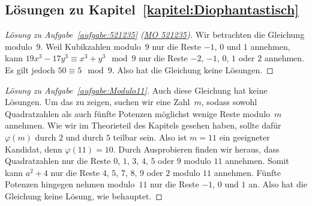 \subsection*{Lösungen zu Kapitel~\ref{kapitel:Diophantastisch}}


\begin{proof}[Lösung zu Aufgabe~\ref{aufgabe:521235} \textmd{(\href{https://www.mathematik-olympiaden.de/moev/index.php?option=com_download&thema=a&format=raw&datei=A52123b.pdf}{MO 521235})}]
	Wir betrachten die Gleichung modulo~$9$. Weil Kubikzahlen modulo~$9$ nur die Reste $-1$, $0$ und $1$ annehmen, kann $19x^3-17y^3\equiv x^3+y^3\mod 9$ nur die Reste $-2$, $-1$, $0$, $1$ oder $2$ annehmen. Es gilt jedoch $50\equiv 5\mod 9$. Also hat die Gleichung keine Lösungen.
\end{proof}

\begin{proof}[Lösung zu Aufgabe~\ref{aufgabe:Modulo11}]
	Auch diese Gleichung hat keine Lösungen. Um das zu zeigen, suchen wir eine Zahl~$m$, sodass sowohl Quadratzahlen als auch fünfte Potenzen möglichst wenige Reste modulo~$m$ annehmen. Wie wir im Theorieteil des Kapitels gesehen haben, sollte dafür $\varphi(m)$ durch $2$ und durch $5$ teilbar sein. Also ist $m=11$ ein geeigneter Kandidat, denn $\varphi(11)=10$. Durch Ausprobieren finden wir heraus, dass Quadratzahlen nur die Reste $0$, $1$, $3$, $4$, $5$ oder $9$ modulo $11$ annehmen. Somit kann $a^2+4$ nur die Reste $4$, $5$, $7$, $8$, $9$ oder $2$ modulo $11$ annehmen. Fünfte Potenzen hingegen nehmen modulo~$11$ nur die Reste $-1$, $0$ und $1$ an. Also hat die Gleichung keine Lösung, wie behauptet.
\end{proof}

